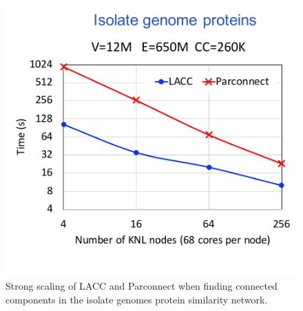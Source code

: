 \begin{figure}[!t]
   \centering
   \includegraphics[scale=.5]{figures/isolates} %
   \caption{Strong scaling of LACC and Parconnect when finding connected components in  the isolate genomes protein similarity network. }
   \label{fig:multiply_nnzx}
\end{figure}




